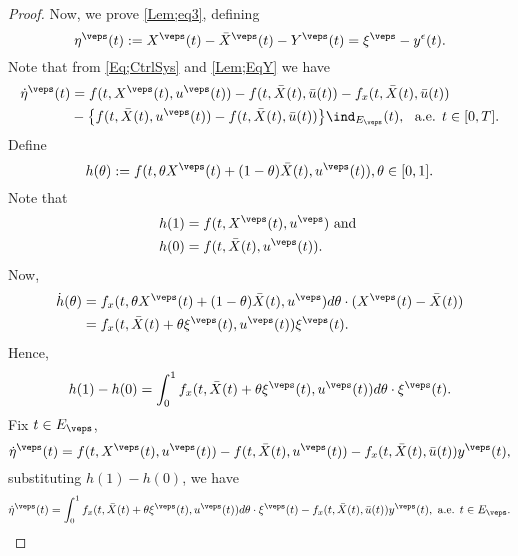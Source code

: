 \begin{proof}
    Now, we prove \cref{Lem;eq3}, defining
    \begin{equation*}
        \eta^{\veps}(t) := X^{\veps}(t) - \Bar{X}^{\veps}(t) - Y^{\veps}(t) = 
        \xi^{\veps} - y^{\epsilon}(t).
    \end{equation*}
    Note that from \cref{Eq;CtrlSys} and \cref{Lem;EqY} we have
    \begin{align*}
        \Dot{\eta}^{\veps}(t) 
        &= f(t, X^{\veps}(t), u^{\veps}(t)) - %
            f(t, \Bar{X}(t), \Bar{u}(t)) - f_{x}(t, \Bar{X}(t), \Bar{u}(t)) \\
        &- \big\{ f(t, \Bar{X}(t), u^{\veps}(t)) - f(t, \Bar{X}(t), \Bar{u}(t))\big\}%
            \ind_{E_{\veps}}(t), \ \text{ a.e. } t \in [0,T].
    \end{align*}
    Define
    \begin{equation*}
        h(\theta) := f(t, \theta X^{\veps}(t) + (1 - \theta)\Bar{X}(t), u^{\veps}(t)), %
        \theta \in [0,1].
    \end{equation*}
    Note that
    \begin{align*}
        h(1) &= f(t, X^{\veps}(t), u^{\veps}) \text{ and } \\
        h(0) &= f(t, \Bar{X}(t), u^{\veps}(t)).
    \end{align*}
    Now,
    \begin{align*}
        \Dot{h}(\theta) &= 
            f_{x}(t,\theta X^{\veps}(t) + (1 - \theta)\Bar{X}(t), u^{\veps}) d\theta \cdot (X^{\veps}(t) - \Bar{X}(t)) \\
        &= f_{x}(t, \Bar{X}(t) + \theta \xi^{\veps}(t),u^{\veps}(t))\xi^{\veps}(t).
    \end{align*}
    Hence,
    \begin{equation*}
        h(1) - h(0) = \int_{0}^{1} f_{x}(t, \Bar{X}(t) + \theta \xi^{\veps}(t), u^{\veps}(t))d\theta \cdot  \xi^{\veps}(t).
    \end{equation*}
    Fix $t \in E_{\veps}$, 
    \begin{equation*}
        \Dot{\eta}^{\veps}(t) = f(t, X^{\veps}(t), u^{\veps}(t)) - f(t,\Bar{X}(t),%
            u^{\veps}(t)) - f_{x}(t, \Bar{X}(t), \Bar{u}(t))y^{\veps}(t),
    \end{equation*}
    substituting $h(1) - h(0)$, we have
    \begin{equation*}
        \Dot{\eta}^{\veps}(t) = \int_{0}^{1} f_{x}(t, \Bar{X}(t) + \theta \xi^{\veps}(t), u^{\veps}(t))d\theta \cdot  \xi^{\veps}(t) -  f_{x}(t, \Bar{X}(t), \Bar{u}(t))y^{\veps}(t), \text{ a.e. } t \in E_{\veps}.

\end{equation*}
\end{proof}
